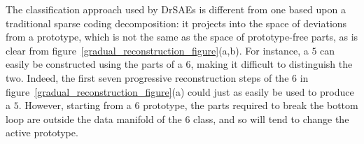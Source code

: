 \documentclass{article} %
\begin{document}
The classification approach used by DrSAEs is different from one based upon a traditional sparse coding decomposition: it projects into the space of deviations from a prototype, which is not the same as the space of prototype-free parts, as is clear from figure~\ref{gradual_reconstruction_figure}(a,b).  For instance, a $5$ can easily be constructed using the parts of a $6$, making it difficult to distinguish the two.  Indeed, the first seven progressive reconstruction steps of the $6$ in figure~\ref{gradual_reconstruction_figure}(a) could just as easily be used to produce a $5$.  However, starting from a $6$ prototype, the parts required to break the bottom loop are outside the data manifold of the $6$ class, and so will tend to change the active prototype.  




\end{document}
